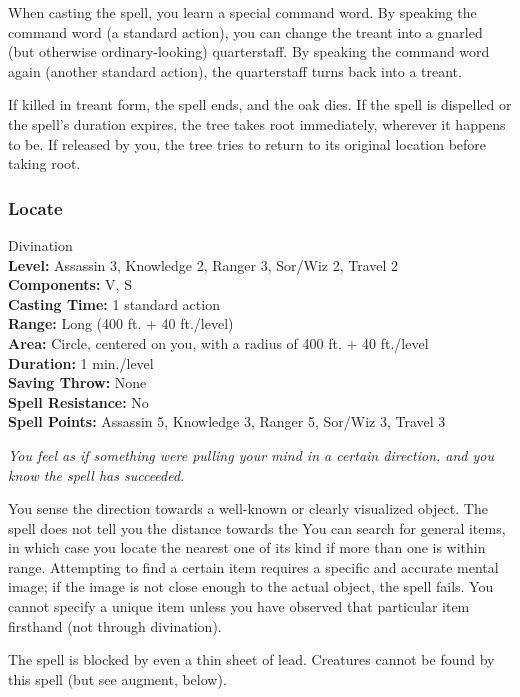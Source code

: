When casting the spell, you learn a special command word. By speaking the command word (a standard action), you can change the treant into a gnarled (but otherwise ordinary-looking) quarterstaff. By speaking the command word again (another standard action), the quarterstaff turns back into a treant.

If killed in treant form, the spell ends, and the oak dies. If the spell is dispelled or the spell's duration expires, the tree takes root immediately, wherever it happens to be. If released by you, the tree tries to return to its original location before taking root.
\subsubsection{Locate}
\label{Spell:Locate}
Divination
\\ \textbf{Level:} Assassin 3, Knowledge 2, Ranger 3, Sor/Wiz 2, Travel 2
\\ \textbf{Components:} V, S
\\ \textbf{Casting Time:} 1 standard action
\\ \textbf{Range:} Long (400 ft. + 40 ft./level)
\\ \textbf{Area:} Circle, centered on you, with a radius of 400 ft. + 40 ft./level
\\ \textbf{Duration:} 1 min./level
\\ \textbf{Saving Throw:} None
\\ \textbf{Spell Resistance:} No
\\ \textbf{Spell Points:} Assassin 5, Knowledge 3, Ranger 5, Sor/Wiz 3, Travel 3

\emph{You feel as if something were pulling your mind in a certain direction, and you know the spell has succeeded.}

You sense the direction towards a well-known or clearly visualized object. The spell does not tell you the distance towards the 
You can search for general items, in which case you locate the nearest one of its kind if more than one is within range. 
Attempting to find a certain item requires a specific and accurate mental image; if the image is not close enough to the actual object, the spell fails. 
You cannot specify a unique item unless you have observed that particular item firsthand (not through divination).

The spell is blocked by even a thin sheet of lead. Creatures cannot be found by this spell (but see augment, below). %

